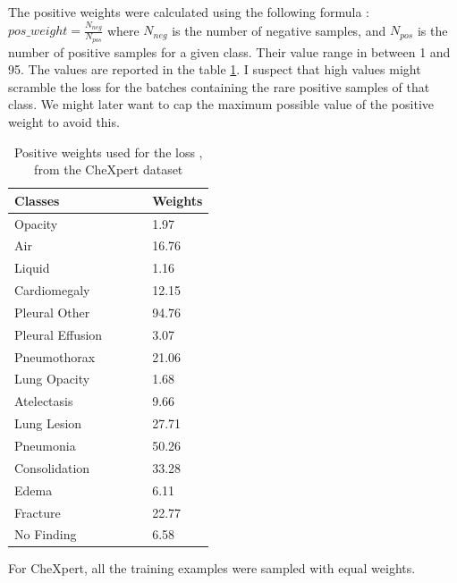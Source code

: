 \documentclass[11pt]{article}
\begin{document}
        The positive weights were calculated using the following formula : $pos\_weight = \frac{N_{neg}}{N_{pos}}$ where $N_{neg}$ is the number of negative samples, and $N_{pos}$ is the number of positive samples for a given class. Their value range
        in between 1 and 95. The values are reported in the table \ref{table:pos_weight_chexpert}. I suspect that high values might scramble the loss for the batches containing the rare positive samples of that class. We might later want to cap
        the maximum possible value of the positive weight to avoid this.



        \begin{table}[h!]
            \centering
            \begin{tabular}{@{}lllll@{}}
            \toprule
            Classes          & & & & Weights \\ \midrule
            Opacity          & & & & 1.97    \\
            Air              & & & & 16.76   \\
            Liquid           & & & & 1.16    \\
            Cardiomegaly     & & & & 12.15   \\
            Pleural Other    & & & & 94.76   \\
            Pleural Effusion & & & & 3.07    \\
            Pneumothorax     & & & & 21.06   \\
            Lung Opacity     & & & & 1.68    \\
            Atelectasis      & & & & 9.66    \\
            Lung Lesion      & & & & 27.71   \\
            Pneumonia        & & & & 50.26   \\
            Consolidation    & & & & 33.28   \\
            Edema            & & & & 6.11    \\
            Fracture         & & & & 22.77   \\
            No Finding       & & & & 6.58    \\ \bottomrule
            \end{tabular}
            \caption{Positive weights used for the loss , from the CheXpert dataset}
            \label{table:pos_weight_chexpert}
        \end{table}

        For CheXpert, all the training examples were sampled with equal weights.
\end{document}
